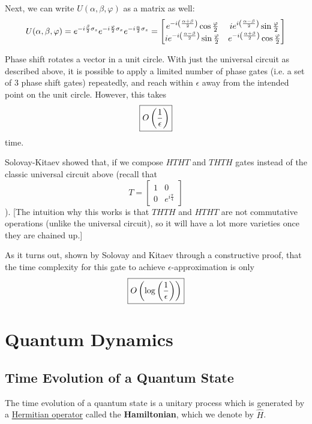 \documentclass[12pt]{article}
\begin{document}
Next, we can write $U(\alpha, \beta, \varphi)$ as a matrix as well: $$
U(\alpha, \beta, \varphi) = e^{-i\frac{\beta}{2}\sigma_z}e^{-i\frac{\varphi}{2}\sigma_x}e^{-i\frac{\alpha}{2}\sigma_z} = \begin{bmatrix}
    e^{-i\left(\frac{\alpha + \beta}{2}\right)}\cos\frac{\varphi}{2} & ie^{i\left(\frac{\alpha - \beta}{2}\right)}\sin\frac{\varphi}{2} \\
    ie^{-i\left(\frac{\alpha - \beta}{2}\right)}\sin\frac{\varphi}{2} & e^{-i\left(\frac{\alpha + \beta}{2}\right)}\cos\frac{\varphi}{2}
    \end{bmatrix}
$$

\begin{remark}
Phase shift rotates a vector in a unit circle. With just the universal circuit as described above, it is possible to apply a limited number of phase gates (i.e. a set of $3$ phase shift gates) repeatedly, and reach within $\epsilon$ away from the intended point on the unit circle. However, this takes $$
\boxed{O\left(\frac{1}{\epsilon}\right)}
$$ time.
\end{remark}

\begin{theorem}
Solovay-Kitaev showed that, if we compose $HTHT$ and $THTH$ gates instead of the classic universal circuit above (recall that $$
T = \begin{bmatrix}
1 & 0\\
0 & e^{i\frac{\pi}{4}}
\end{bmatrix}
$$). [The intuition why this works is that $THTH$ and $HTHT$ are not commutative operations (unlike the universal circuit), so it will have a lot more varieties once they are chained up.]

As it turns out, shown by Solovay and Kitaev through a constructive proof, that the time complexity for this gate to achieve $\epsilon$-approximation is only $$
\boxed{O\left(\log\left(\frac{1}{\epsilon}\right)\right)}
$$
\end{theorem}

\section{Quantum Dynamics}
\subsection{Time Evolution of a Quantum State}
The time evolution of a quantum state is a unitary process which is generated by a \underline{Hermitian operator} called the \textbf{Hamiltonian}, which we denote by $\hat{H}$.
\end{document}
